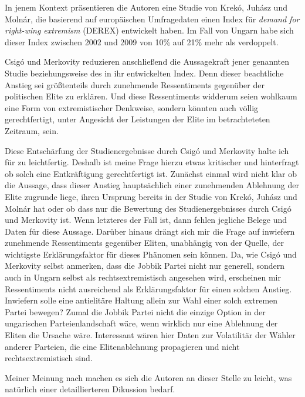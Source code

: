 \documentclass[11pt]{report}
\begin{document}
In jenem Kontext präsentieren die Autoren eine Studie von Krekó, Juhász und Molnár, die basierend auf europäischen Umfragedaten einen Index für \emph{demand for right-wing extremism} (DEREX) entwickelt haben. Im Fall von Ungarn habe sich dieser Index zwischen 2002 und 2009 von 10\% auf 21\% mehr als verdoppelt.

Csigó und Merkovity reduzieren anschließend die Aussagekraft jener genannten Studie beziehungsweise des in ihr entwickelten Index. Denn dieser beachtliche Anstieg sei größtenteils durch zunehmende Ressentiments gegenüber der politischen Elite zu erklären. Und diese Ressentiments widderum seien wohlkaum eine Form von extremistischer Denkweise, sondern könnten auch völlig gerechtfertigt, unter Angesicht der Leistungen der Elite im betrachteteten Zeitraum, sein.

Diese Entschärfung der Studienergebnisse durch Csigó und Merkovity halte ich für zu leichtfertig. Deshalb ist meine Frage hierzu etwas kritischer und hinterfragt ob solch eine Entkräftigung gerechtfertigt ist. Zunächst einmal wird nicht klar ob die Aussage, dass dieser Anstieg hauptsächlich einer zunehmenden Ablehnung der Elite zugrunde liege, ihren Ursprung bereits in der Studie von Krekó, Juhász und Molnár hat oder ob dass nur die Bewertung des Studienergebnisses durch Csigó und Merkovity ist. Wenn letzteres der Fall ist, dann fehlen jegliche Belege und Daten für diese Aussage. Darüber hinaus drängt sich mir die Frage auf inwiefern zunehmende Ressentiments gegenüber Eliten, unabhängig von der Quelle, der wichtigste Erklärungsfaktor für dieses Phänomen sein können. Da, wie Csigó und Merkovity selbst anmerken, dass die Jobbik Partei nicht nur generell, sondern auch in Ungarn selbst als rechtsextremistisch angesehen wird, erscheinen mir Ressentiments nicht ausreichend als Erklärungsfaktor für einen solchen Anstieg. Inwiefern solle eine antielitäre Haltung allein zur Wahl einer solch extremen Partei bewegen? Zumal die Jobbik Partei nicht die einzige Option in der ungarischen Parteienlandschaft wäre, wenn wirklich nur eine Ablehnung der Eliten die Ursache wäre. Interessant wären hier Daten zur Volatilitär der Wähler anderer Parteien, die eine Elitenablehnung propagieren und nicht rechtsextremistisch sind.

Meiner Meinung nach machen es sich die Autoren an dieser Stelle zu leicht, was natürlich einer detaillierteren Dikussion bedarf.
\end{document}
